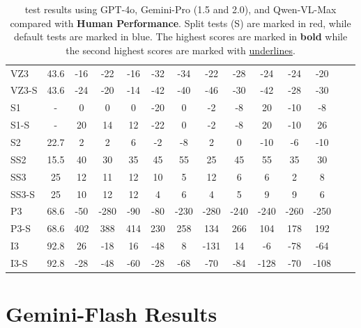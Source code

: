 \begin{table*}[h]
{\begin{tabular}{lccccccccccccc}
    \cellcolor{myblue!34.0} VZ3 & 43.6 & -16  & -22  & -16  & -32  & -34  & -22  & -28  & -24  & -24  & -20 \\
    \cellcolor{myred!34.0} VZ3-S & 43.6 & -24  & -20  & -14  & -42  & -40  & -46  & -30  & -42  & -28  & -30 \\
    \midrule
    \cellcolor{myblue!34.0} S1 & - & 0  & 0  & 0  & -20  & 0  & -2  & -8  & 20  & -10  & -8 \\
    \cellcolor{myred!34.0} S1-S & - & 20  & 14  & 12  & -22  & 0  & -2  & -8  & 20  & -10  & 26  \\
    \cellcolor{myblue!34.0} S2 & 22.7& 2  & 2  & 6  & -2  & -8  & 2  & 0  & -10  & -6  & -10 \\
    \midrule
    \cellcolor{myblue!34.0} SS2 & 15.5 & 40  & 30  & 35  & 45  & 55  & 25  & 45  & 55  & 35  & 30 \\
    \cellcolor{myblue!34.0} SS3 & 25 & 12  & 11  & 12  & 10  & 5  & 12  & 6  & 6  & 2  & 8 \\
    \cellcolor{myred!34.0} SS3-S & 25 & 10  & 12  & 12  & 4  & 6  & 4  & 5  & 9  & 9  & 6 \\
    \midrule
    \cellcolor{myblue!34.0} P3 & 68.6 & -50  & -280  & -90  & -80  & -230  & -280  & -240  & -240  & -260  & -250 \\
    \cellcolor{myred!34.0} P3-S & 68.6 & 402  & 388  & 414  & 230  & 258  & 134  & 266  & 104  & 178  & 192 \\
    \midrule
    \cellcolor{myblue!34.0} I3 & 92.8 & 26  & -18  & 16  & -48  & 8  & -131  & 14  & -6  & -78  & -64 \\
    \cellcolor{myred!34.0} I3-S & 92.8 & -28  & -48  & -60  & -28  & -68  & -70  & -84  & -128  & -70  & -108 \\
    \bottomrule
    \end{tabular}
    }
    \caption{{\methodname} test results using GPT-4o, Gemini-Pro (1.5 and 2.0), and Qwen-VL-Max compared with \textbf{Human Performance}. Split tests (S) are marked in \colorbox{myred!34}{red}, while default tests are marked in \colorbox{myblue!34}{blue}. The highest scores are marked in \textbf{bold} while the second highest scores are marked with \underline{underlines}.}
    \label{tab:main-human}
\end{table*}

\clearpage

\section{Gemini-Flash Results}

